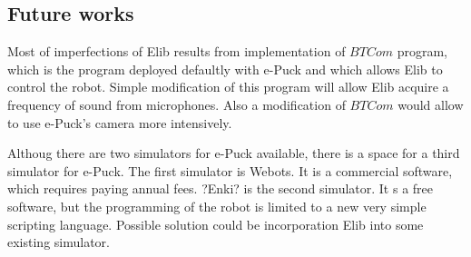 \subsection*{Future works}
	Most of imperfections of Elib results from implementation of $BTCom$ program,
	which is the program deployed defaultly with e-Puck and which allows Elib to control the robot.
	Simple modification of this program will allow Elib acquire a frequency of sound from microphones.
	Also a modification of $BTCom$ would allow to use e-Puck's camera more intensively.

	Althoug there are two simulators for e-Puck available, there is a space for a third simulator for e-Puck.
	The first simulator is Webots. It is a commercial software, which requires paying annual fees.
	?Enki? is the second simulator. It s a free software, but the programming of the robot is limited to a new very simple scripting language.
	Possible solution could be incorporation Elib into some existing simulator.
